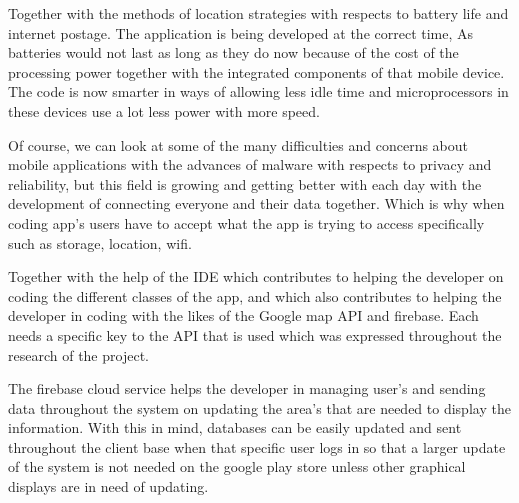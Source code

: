 \par Together with the methods of location strategies with respects to battery life and internet postage. The application is being developed at the correct time, As batteries would not last as long as they do now because of the cost of the processing power together with the integrated components of that mobile device. The code is now smarter in ways of allowing less idle time and microprocessors in these devices use a lot less power with more speed.

\par Of course, we can look at some of the many difficulties and concerns about mobile applications with the advances of malware with respects to privacy and reliability, but this field is growing and getting better with each day with the development of connecting everyone and their data together. Which is why when coding app's users have to accept what the app is trying to access specifically such as storage, location, wifi.

\par Together with the help of the IDE which contributes to helping the developer on coding the different classes of the app, and which also contributes to helping the developer in coding with the likes of the Google map API and firebase. Each needs a specific key to the API that is used which was expressed throughout the research of the project. 

\par The firebase cloud service helps the developer in managing user's and sending data throughout the system on updating the area's that are needed to display the information. With this in mind, databases can be easily updated and sent throughout the client base when that specific user logs in so that a larger update of the system is not needed on the google play store unless other graphical displays are in need of updating.
